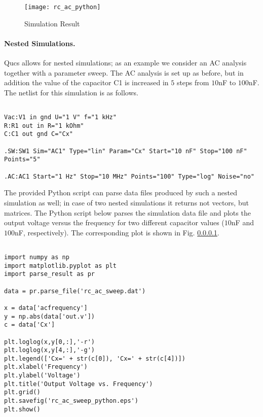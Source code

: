 \begin{figure}[h]
\begin{center}
  \texttt{[image: rc\_ac\_python]}
  \caption{Simulation Result}
  \label{plot:rc_ac_python}
\end{center}
\end{figure}


\pagebreak

\paragraph{Nested Simulations.}Qucs allows for nested simulations; as an example we consider an AC analysis together with a parameter sweep. The AC analysis is set up as before, but in addition the value of the capacitor C1 is increased in $5$ steps from $10$nF to $100$nF. The netlist for this simulation is as follows.


\begin{verbatim}

Vac:V1 in gnd U="1 V" f="1 kHz"
R:R1 out in R="1 kOhm"
C:C1 out gnd C="Cx"

.SW:SW1 Sim="AC1" Type="lin" Param="Cx" Start="10 nF" Stop="100 nF" Points="5"

.AC:AC1 Start="1 Hz" Stop="10 MHz" Points="100" Type="log" Noise="no"

\end{verbatim}


The provided Python script can parse data files produced by such a nested simulation as well; in case of two nested simulations it returns not vectors, but matrices. The Python script below parses the simulation data file and plots the output voltage versus the frequency for two different capacitor values ($10$nF and $100$nF, respectively). The corresponding plot is shown in Fig. \ref{}.


\begin{verbatim}

import numpy as np
import matplotlib.pyplot as plt
import parse_result as pr

data = pr.parse_file('rc_ac_sweep.dat')

x = data['acfrequency']
y = np.abs(data['out.v'])
c = data['Cx']

plt.loglog(x,y[0,:],'-r')
plt.loglog(x,y[4,:],'-g')
plt.legend(['Cx=' + str(c[0]), 'Cx=' + str(c[4])])
plt.xlabel('Frequency')
plt.ylabel('Voltage')
plt.title('Output Voltage vs. Frequency')
plt.grid()
plt.savefig('rc_ac_sweep_python.eps')
plt.show()


\end{verbatim}


